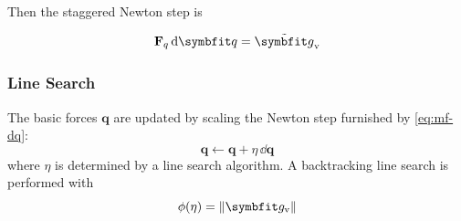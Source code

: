 Then the staggered Newton step is

\begin{equation}
\mathbf{F}_q\,\dd \bm{q} = \tilde{\bm{g}}_{\rm v} %
\label{eq:mf-dq}
\end{equation}

\subsubsection{Line Search}
The basic forces \(\bm{q}\) are updated by scaling the Newton step furnished by \eqref{eq:mf-dq}:
\begin{equation}
\bm{q} \leftarrow \bm{q} + \eta\, \dd \bm{q}
\label{eq:def-line-search}
\end{equation}
where \(\eta\) is determined by a line search algorithm. 
A backtracking line search is performed with 
\begin{equation}
\phi(\eta) = \|\residv\|
\label{eq:def-line-merit}
\end{equation}